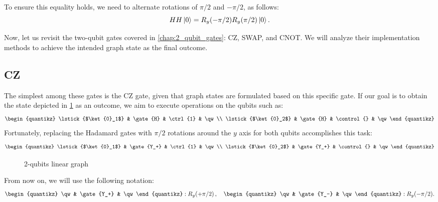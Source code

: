 To ensure this equality holds, we need to alternate rotations of $\pi /2$ and $-\pi / 2$, as follows:
\begin{equation}
    H H \ket{0} =
    R_y(- \pi / 2) R_y(\pi / 2) \ket{0} .
\end{equation}

Now, let us revisit the two-qubit gates covered in \cref{chap:2_qubit_gates}: CZ, SWAP, and CNOT.
We will analyze their implementation methods to achieve the intended graph state as the final outcome.

\subsection{CZ}

The simplest among these gates is the CZ gate, given that graph states are formulated based on this specific gate. 
If our goal is to obtain the state depicted in \cref{fig:CZ_graph} as an outcome, we aim to execute operations on the qubits such as:
\begin{equation}
    \begin{quantikz}
      \lstick{$\ket{0}_1$} & \gate{H} & \ctrl{1} & \qw \\
      \lstick{$\ket{0}_2$} & \gate{H} & \control{} & \qw
    \end{quantikz}
\end{equation}
Fortunately, replacing the Hadamard gates with $\pi/2$ rotations around the $y$ axis for both qubits accomplishes this task:
\begin{equation}
    \begin{quantikz}
      \lstick{$\ket{0}_1$} & \gate{Y_+} & \ctrl{1} & \qw \\
      \lstick{$\ket{0}_2$} & \gate{Y_+} & \control{} & \qw
    \end{quantikz}
\end{equation}

\begin{figure}
    \centering
    
    \vspace{-1cm}
    \caption{2-qubits linear graph}
    \label{fig:CZ_graph}
\end{figure}

From now on, we will use the following notation:
\begin{equation*}
    \begin{quantikz}
        \qw & \gate{Y_+} & \qw
    \end{quantikz}
    : R_y(+\pi/2) \, , \quad
    \begin{quantikz}
        \qw & \gate{Y_-} & \qw
    \end{quantikz}
    : R_y(-\pi/2) .
\end{equation*}


